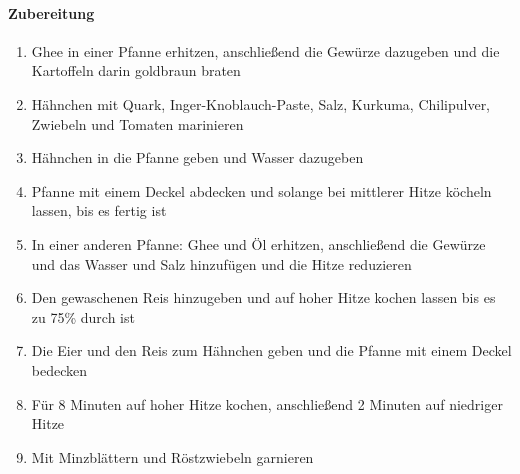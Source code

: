 \paragraph{Zubereitung}
\begin{enumerate}[noitemsep]
	\item Ghee in einer Pfanne erhitzen, anschließend die Gewürze dazugeben und die Kartoffeln darin goldbraun braten
	\item Hähnchen mit Quark, Inger-Knoblauch-Paste, Salz, Kurkuma, Chilipulver, Zwiebeln und Tomaten marinieren
	\item Hähnchen in die Pfanne geben und Wasser dazugeben
	\item Pfanne mit einem Deckel abdecken und solange bei mittlerer Hitze köcheln lassen, bis es fertig ist
	\item In einer anderen Pfanne: Ghee und Öl erhitzen, anschließend die Gewürze und das Wasser und Salz hinzufügen und die Hitze reduzieren
	\item Den gewaschenen Reis hinzugeben und auf hoher Hitze kochen lassen bis es zu 75\% durch ist
	\item Die Eier und den Reis zum Hähnchen geben und die Pfanne mit einem Deckel bedecken
	\item Für 8 Minuten auf hoher Hitze kochen, anschließend 2 Minuten auf niedriger Hitze
	\item Mit Minzblättern und Röstzwiebeln garnieren
\end{enumerate}